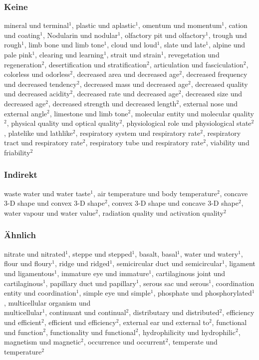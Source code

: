 \subsubsection{Keine}
mineral und terminal$^1$, plastic und aplastic$^1$, omentum und momentum$^1$, cation und
coating$^1$, Nodularin und nodular$^1$, olfactory pit und olfactory$^1$, trough und
rough$^1$, limb bone und limb tone$^1$, cloud und loud$^1$, slate und late$^1$, alpine und
pale pink$^1$, clearing und learning$^1$, strait und strain$^1$, revegetation und
regeneration$^2$, desertification und stratification$^2$, articulation und
fasciculation$^2$, colorless und odorless$^2$, decreased area und decreased age$^2$,
decreased frequency und decreased tendency$^2$, decreased mass und decreased age$^2$,
decreased quality und decreased acidity$^2$, decreased rate und decreased age$^2$,
decreased size und decreased age$^2$, decreased strength und decreased length$^2$,
external nose und external angle$^2$, limestone und limb tone$^2$, molecular entity und
molecular quality$^2$, physical quality und optical quality$^2$, physiological
role und physiological state$^2$, platelike und lathlike$^2$, respiratory system und
respiratory rate$^2$, respiratory tract und respiratory rate$^2$, respiratory tube und
respiratory rate$^2$, viability und friability$^2$\\

\subsubsection{Indirekt}
waste water und water taste$^1$, air temperature und body temperature$^2$, concave 3-D
shape und convex 3-D shape$^2$, convex 3-D shape und concave 3-D shape$^2$, water
vapour und water value$^2$, radiation quality und activation quality$^2$

\subsubsection{Ähnlich}
nitrate und nitrated$^1$, steppe und stepped$^1$, basalt, basal$^1$, water und
watery$^1$, flour und floury$^1$, ridge und ridged$^1$, semicircular duct und
semicircular$^1$, ligament und ligamentous$^1$, immature eye und immature$^1$,
cartilaginous joint und cartilaginous$^1$, papillary duct und papillary$^1$, serous
sac und serous$^1$, coordination entity und coordination$^1$, simple eye und simple$^1$,
phosphate und phosphorylated$^1$, multicellular organism und\\multicellular$^1$,
continuant und continual$^2$, distributary und distributed$^2$, efficiency und
efficient$^2$, efficient und efficiency$^2$, external ear und external to$^2$,
functional und function$^2$, functionality und functional$^2$, hydrophilicity und
hydrophilic$^2$, magnetism und magnetic$^2$, occurrence und occurrent$^2$, temperate und
temperature$^2$

